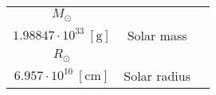 \begin{center}
\begin{tabularx}{\textwidth}{ccX}
$M_{\odot}$	&
	\begin{tabular}{c}
        $1.98847\cdot 10^{30}\ [\si{\kilogram}]$ \\
         $1.98847\cdot 10^{33}\ [\si{\gram}]$
	\end{tabular} 
	& Solar mass \\

$R_{\odot}$	&
	\begin{tabular}{c}
        $6.957\cdot 10^{8}\ [\si{\m}]$ \\
        $6.957\cdot 10^{10}\ [\si{\cm}]$
	\end{tabular} 
	& Solar radius \\
	
\hline

\end{tabularx}

\endgroup

\end{center}
